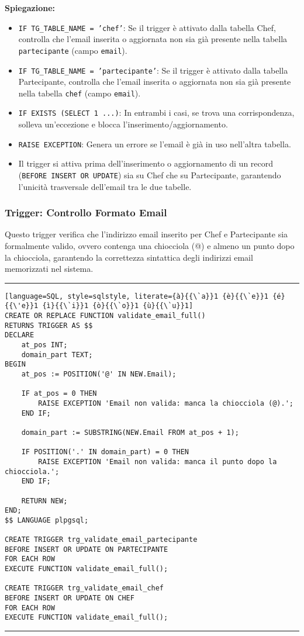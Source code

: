 \textbf{Spiegazione:}
\begin{itemize}
    \item \texttt{IF TG\_TABLE\_NAME = 'chef'}: Se il trigger è attivato dalla tabella Chef, controlla che l'email inserita o aggiornata non sia già presente nella tabella \texttt{partecipante} (campo \texttt{email}).
    \item \texttt{IF TG\_TABLE\_NAME = 'partecipante'}: Se il trigger è attivato dalla tabella Partecipante, controlla che l'email inserita o aggiornata non sia già presente nella tabella \texttt{chef} (campo \texttt{email}).
    \item \texttt{IF EXISTS (SELECT 1 ...)}: In entrambi i casi, se trova una corrispondenza, solleva un'eccezione e blocca l'inserimento/aggiornamento.
    \item \texttt{RAISE EXCEPTION}: Genera un errore se l'email è già in uso nell'altra tabella.
    \item Il trigger si attiva prima dell'inserimento o aggiornamento di un record (\texttt{BEFORE INSERT OR UPDATE}) sia su Chef che su Partecipante, garantendo l'unicità trasversale dell'email tra le due tabelle.
\end{itemize}

\subsubsection{Trigger: Controllo Formato Email}

Questo trigger verifica che l'indirizzo email inserito per Chef e Partecipante sia formalmente valido, ovvero contenga una chiocciola (@) e almeno un punto dopo la chiocciola, garantendo la correttezza sintattica degli indirizzi email memorizzati nel sistema.

\noindent\rule{\textwidth}{0.4pt}
\begin{lstlisting}[language=SQL, style=sqlstyle, literate={à}{{\`a}}1 {è}{{\`e}}1 {é}{{\'e}}1 {ì}{{\`i}}1 {ò}{{\`o}}1 {ù}{{\`u}}1]
CREATE OR REPLACE FUNCTION validate_email_full()
RETURNS TRIGGER AS $$
DECLARE
    at_pos INT;
    domain_part TEXT;
BEGIN
    at_pos := POSITION('@' IN NEW.Email);

    IF at_pos = 0 THEN
        RAISE EXCEPTION 'Email non valida: manca la chiocciola (@).';
    END IF;

    domain_part := SUBSTRING(NEW.Email FROM at_pos + 1);

    IF POSITION('.' IN domain_part) = 0 THEN
        RAISE EXCEPTION 'Email non valida: manca il punto dopo la chiocciola.';
    END IF;

    RETURN NEW;
END;
$$ LANGUAGE plpgsql;

CREATE TRIGGER trg_validate_email_partecipante
BEFORE INSERT OR UPDATE ON PARTECIPANTE
FOR EACH ROW
EXECUTE FUNCTION validate_email_full();

CREATE TRIGGER trg_validate_email_chef
BEFORE INSERT OR UPDATE ON CHEF
FOR EACH ROW
EXECUTE FUNCTION validate_email_full();
\end{lstlisting}
\noindent\rule{\textwidth}{0.4pt}

